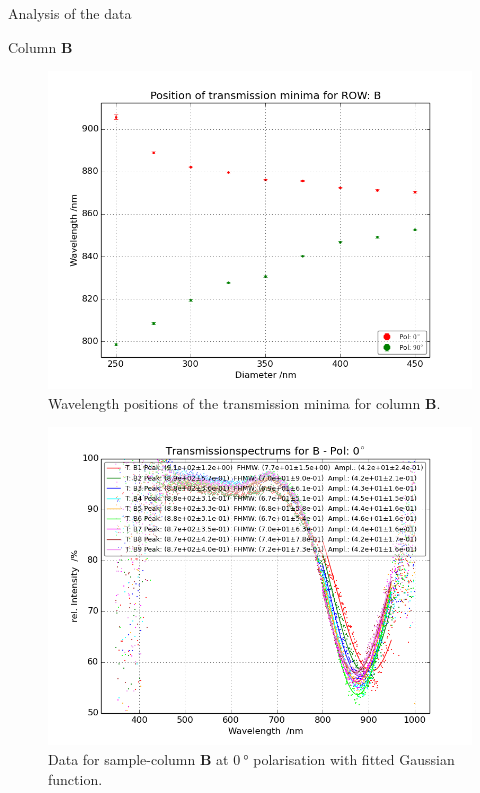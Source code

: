 \documentclass[pdftex, a4paper,11pt, twoside, UKenglish]{report}
\begin{document}
\begin{chapter}{Analysis of the data}
\begin{section}{Column \textbf{B}}
      \begin{figure}[b!]
        \centering
        \includegraphics[width=\textwidth]{Figures/MinimaPosB.png}
        \caption{Wavelength positions of the transmission minima for column
            \textbf{B}.}
        \label{fig:MinimaPosB}
      \end{figure}
      \newpage
      \begin{figure}[ht!]
        \centering
        \begin{minipage}{.95\textwidth}
          \centering
          \includegraphics[width=\textwidth]
              {Figures/TransspecFIT_BPol0.png}
          \caption{Data for sample-column \textbf{B} at $\SI{0}{\degree}$
              polarisation with fitted Gaussian function.}

\end{minipage}
\end{figure}
\end{section}
\end{chapter}
\end{document}
